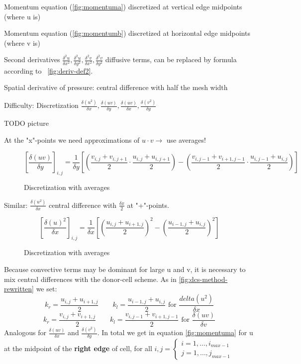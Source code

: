 Momentum equation (\ref{fig:momentuma}) discretized at vertical edge midpoints (where u is)

Momentum equation (\ref{fig:momentumb}) discretized at horizontal edge midpoints (where v is)

Second derivatives $\frac{\delta^2 u}{\delta x^2}, \frac{\delta^2 u}{\delta y^2}, \frac{\delta^2 v}{\delta x^2}, \frac{\delta^2 v}{\delta y^2}$ diffusive terms, can be replaced by formula according to ~\ref{fig:deriv-def2}.

Spatial derivative of pressure: central difference with half the mesh width

Difficulty: Discretization $\frac{\delta(u^2)}{\delta x}, \frac{\delta(uv)}{\delta y}, \frac{\delta(uv)}{\delta x}, \frac{\delta(v^2)}{\delta y}$

TODO picture

At the "x"-points we need approximations of $u \cdot v \rightarrow$ use averages!

\begin{figure}[H]
	\centering
	\[ \left[ \frac{\delta (uv)}{\delta y}\right]_{i,j} = \frac{1}{\delta y}\left[ \left( \frac{v_{i,j} + v_{i,j+1}}{2} \cdot \frac{u_{i,j} + u_{i,j+1}}{2} \right) - \left( \frac{v_{i,j-1} + v_{i+1, j-1}}{2} \cdot \frac{u_{i,j-1} + u_{i,j}}{2}\right) \right] \]
	\renewcommand{\thefigure}{3.17}
	\caption{Discretization with averages}
	\label{fig:disc-spec}
\end{figure}

Similar: $\frac{\delta(u^2)}{\delta x}$ central difference with $\frac{\delta x}{2}$ at "+"-points.

\begin{figure}[H]
	\centering
	\[ \left[ \frac{\delta (u)^2}{\delta x}\right]_{i,j} = \frac{1}{\delta x}\left[ \left( \frac{u_{i,j} + u_{i+1,j}}{2}\right)^2 - \left( \frac{u_{i-1,j} + u_{i, j}}{2}\right)^2 \right] \]
	\renewcommand{\thefigure}{3.18}
	\caption{Discretization with averages}
	\label{fig:disc-spec}
\end{figure}

Because convective terms may be dominant for large u and v, it is necessary to mix central differences with the donor-cell scheme. As in \ref{fig:dcs-method-rewritten} we set:
\[ k_r = \frac{u_{i,j} + u_{i+1,j}}{2} \qquad k_l = \frac{u_{i-1,j} + u_{i,j}}{2} \text{ for } \frac{delta(u^2)}{\delta x}\]
\[ k_r = \frac{v_{i,j} + v_{i+1,j}}{2} \qquad k_l = \frac{v_{i,j-1} + v_{i+1,j-1}}{2} \text{ for } \frac{\delta(uv)}{\delta v}\]
Analogous for $\frac{\delta(uv)}{\delta x}$ and $\frac{\delta(v^2)}{\delta y}$. In total we get in equation \ref{fig:momentuma} for u at the midpoint of the \textbf{right edge} of cell, for all $i,j = \begin{cases}
i = 1, \dots, i_{max-1} \\
j = 1, \dots, j_{max-1}
\end{cases}$

